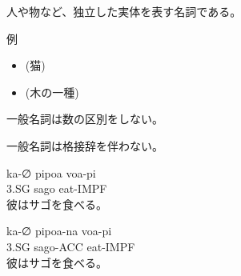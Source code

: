 人や物など、独立した実体を表す名詞である。

例
\begin{itemize}
\item {} (猫)
\item {} (木の一種)
\end{itemize}

一般名詞は数の区別をしない。

一般名詞は格接辞を伴わない。
\begin{exe}
    \ex \gll ka-∅ pipoa voa-pi \\
        3.SG sago eat-IMPF \\
        \glt 彼はサゴを食べる。
\end{exe}
\begin{exe}
    \ex \gll *ka-∅ pipoa-na voa-pi \\
        3.SG sago-ACC eat-IMPF \\
        \glt 彼はサゴを食べる。
\end{exe}
